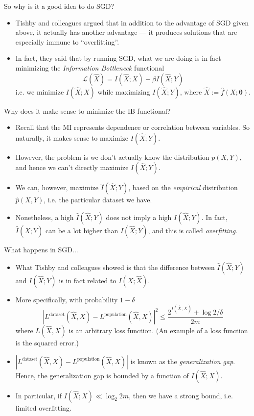 \documentclass{beamer}
\begin{document}
\begin{frame}{So why is it a good idea to do SGD?}
	\begin{itemize}
		\item Tishby and colleagues argued that in addition to the advantage of SGD given above, it actually has another advantage --- it produces solutions that are especially immune to ``overfitting''. 
		\item In fact, they said that by running SGD, what we are doing is in fact minimizing the \emph{Information Bottleneck} functional 
		\[
			\mathcal{L}(\hat{X}) = I(\hat{X};X) - \beta I(\hat{X};Y)
		\]
		i.e. we minimize $I(\hat{X};X)$ while maximizing $I(\hat{X};Y)$, where $\hat{X}:=\hat{f}(X; \boldsymbol{\theta})$. 
		\end{itemize}
\end{frame}

\begin{frame}{Why does it make sense to minimize the IB functional?}
\begin{itemize}
	\item Recall that the MI represents dependence or correlation between variables. So naturally, it makes sense to maximize $I(\hat{X};Y)$. 
	\item However, the problem is we don't actually know the distribution $p(X,Y)$, and hence we can't directly maximize $I(\hat{X};Y)$. 
	\item We can, however, maximize $\hat{I}(\hat{X};Y)$, based on the \emph{empirical} distribution $\hat{p}(X,Y)$, i.e. the particular dataset we have. 
	\item Nonetheless, a high $\hat{I}(\hat{X};Y)$ does not imply a high $I(\hat{X};Y)$. In fact, $\hat{I}(\hat{X};Y)$ can be a lot higher than $I(\hat{X};Y)$, and this is called \emph{overfitting}. 
\end{itemize}
\end{frame}

\begin{frame}{What happens in SGD...}
\begin{itemize}
	\item What Tishby and colleagues showed is that the difference between $\hat{I}(\hat{X};Y)$  and $I(\hat{X};Y)$ is in fact related to $I(X;\hat{X})$. 
	\item More specifically, with probability $1 - \delta$
	\[
	|L^{\text{dataset}}(\hat{X}, X) - L^{\text{population}}(\hat{X}, X)|^2 \leq \frac{2^{I(\hat{X};X)} + \log 2/\delta}{2m}
	\]
	where $L(\hat{X}, X)$ is an arbitrary loss function. (An example of a loss function is the squared error.)
	\item $|L^{\text{dataset}}(\hat{X}, X) - L^{\text{population}}(\hat{X}, X)|$ is known as the \emph{generalization gap}. Hence, the generalization gap is bounded by a function of $I(\hat{X};X)$. 
	\item In particular, if $I(\hat{X};X) \ll \log_2 2m$, then we have a strong bound, i.e. limited overfitting. 
\end{itemize}
\end{frame}
\end{document}
